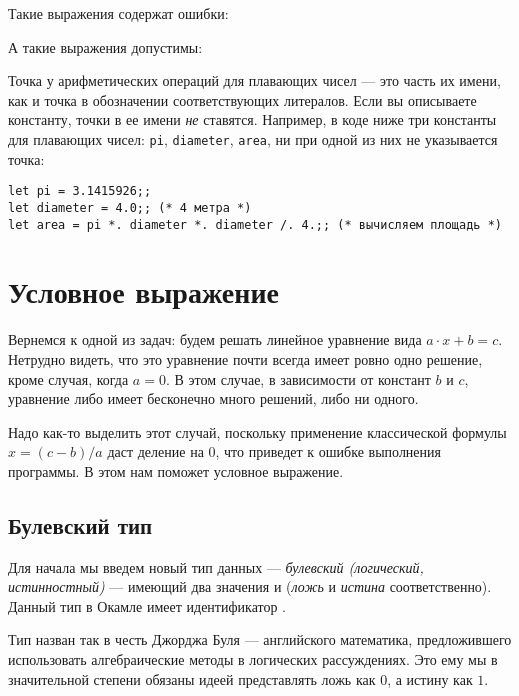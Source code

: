 \begin{example}
Такие выражения содержат ошибки:
\begin{center}
\quad{}\quad{}
\end{center}
А такие выражения допустимы:
\begin{center}
\quad{}\quad{}
\end{center}
\end{example}

Точка у арифметических операций для плавающих
чисел --- это часть их имени, как и точка в обозначении соответствующих
литералов. Если вы описываете константу, точки в ее имени \emph{не} ставятся.
Например, в коде ниже три константы для плавающих чисел: \verb!pi!, \verb!diameter!, \verb!area!,
ни при одной из них не указывается точка:
\begin{verbatim}
let pi = 3.1415926;;
let diameter = 4.0;; (* 4 метра *)
let area = pi *. diameter *. diameter /. 4.;; (* вычисляем площадь *)
\end{verbatim}

\section{Условное выражение}

Вернемся к одной из задач: будем решать линейное уравнение вида $a \cdot x + b = c$.
Нетрудно видеть, что это уравнение почти всегда имеет ровно одно решение,
кроме случая, когда $a = 0$. В этом случае, в зависимости от констант $b$ и 
$c$, уравнение либо имеет бесконечно много решений, либо ни одного.

Надо как-то выделить этот случай, поскольку применение классической формулы
$x = (c - b)/a$ даст деление на $0$, что приведет к ошибке выполнения 
программы. В этом нам поможет условное выражение.

\subsection{Булевский тип}

Для начала мы введем новый тип данных --- \emph{булевский (логический, истинностный)} --- 
имеющий два значения  и  (\emph{ложь} и \emph{истина} 
соответственно). Данный тип в Окамле имеет идентификатор .

Тип назван так в честь Джорджа Буля --- английского математика, 
предложившего использовать алгебраические методы в логических рассуждениях.
Это ему мы в значительной степени обязаны идеей представлять ложь как $0$,
а истину как $1$.

